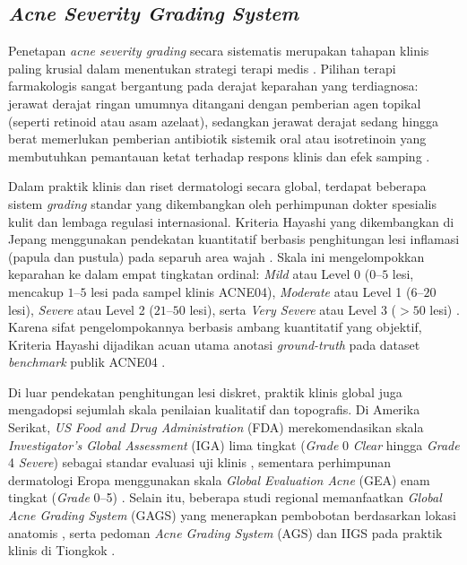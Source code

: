 \subsection{\textit{Acne Severity Grading System}}
Penetapan \textit{acne severity grading} secara sistematis merupakan tahapan klinis paling krusial dalam menentukan strategi terapi medis \cite{hayashi2008, lopez2023}. Pilihan terapi farmakologis sangat bergantung pada derajat keparahan yang terdiagnosa: jerawat derajat ringan umumnya ditangani dengan pemberian agen topikal (seperti retinoid atau asam azelaat), sedangkan jerawat derajat sedang hingga berat memerlukan pemberian antibiotik sistemik oral atau isotretinoin yang membutuhkan pemantauan ketat terhadap respons klinis dan efek samping \cite{hayashi2008, vut2025}.

Dalam praktik klinis dan riset dermatologi secara global, terdapat beberapa sistem \textit{grading} standar yang dikembangkan oleh perhimpunan dokter spesialis kulit dan lembaga regulasi internasional. Kriteria Hayashi yang dikembangkan di Jepang menggunakan pendekatan kuantitatif berbasis penghitungan lesi inflamasi (papula dan pustula) pada separuh area wajah \cite{hayashi2008}. Skala ini mengelompokkan keparahan ke dalam empat tingkatan ordinal: \textit{Mild} atau Level 0 ($0$--$5$ lesi, mencakup $1$--$5$ lesi pada sampel klinis ACNE04), \textit{Moderate} atau Level 1 ($6$--$20$ lesi), \textit{Severe} atau Level 2 ($21$--$50$ lesi), serta \textit{Very Severe} atau Level 3 ($>50$ lesi) \cite{hayashi2008, wu2019}. Karena sifat pengelompokannya berbasis ambang kuantitatif yang objektif, Kriteria Hayashi dijadikan acuan utama anotasi \textit{ground-truth} pada dataset \textit{benchmark} publik ACNE04 \cite{wu2019, layeredlabs2026acne04}.

Di luar pendekatan penghitungan lesi diskret, praktik klinis global juga mengadopsi sejumlah skala penilaian kualitatif dan topografis. Di Amerika Serikat, \textit{US Food and Drug Administration} (FDA) merekomendasikan skala \textit{Investigator's Global Assessment} (IGA) lima tingkat (\textit{Grade} 0 \textit{Clear} hingga \textit{Grade} 4 \textit{Severe}) sebagai standar evaluasi uji klinis \cite{watanabe2025}, sementara perhimpunan dermatologi Eropa menggunakan skala \textit{Global Evaluation Acne} (GEA) enam tingkat (\textit{Grade} 0--5) \cite{huynh2022}. Selain itu, beberapa studi regional memanfaatkan \textit{Global Acne Grading System} (GAGS) yang menerapkan pembobotan berdasarkan lokasi anatomis \cite{wang2023}, serta pedoman \textit{Acne Grading System} (AGS) dan IIGS pada praktik klinis di Tiongkok \cite{yu2023, gao2025}.

